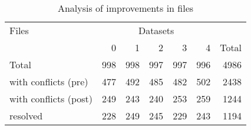 \documentclass[a4paper,12pt]{article}
\begin{document}
\begin{table}[ht]
\begin{center}

\begin{tabular}[h]{l||r|r|r|r|r||r}
Files &  \multicolumn{5}{c}{Datasets} \\
        & 0 & 1 & 2 & 3 & 4 & Total \\
\hline
Total & 998 & 998 & 997 & 997 & 996 & 4986\\ 
\hline
with conflicts (pre) & 477 &	492 & 485 & 482	& 502 &	2438\\ 
with conflicts (post) & 249	& 243 &	240 & 253 &	259 & 1244\\
\hline
resolved & 228 & 249 & 245 & 229 & 243 & 1194

\end{tabular}
\end{center}
\caption{Analysis of improvements in files}
\label{tab:files}
\end{table}
\end{document}
